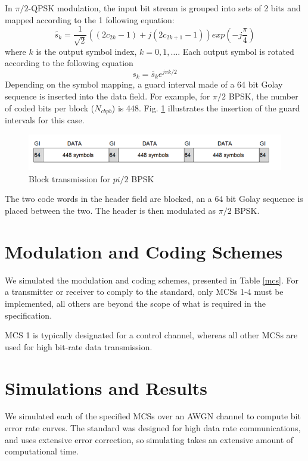 \documentclass[conference]{IEEEtran}
\begin{document}
In $\pi/2$-QPSK modulation, the input bit stream is grouped into sets of 2 bits and mapped according to the
1
following equation: 
\begin{equation}
\tilde{s_k} = \frac{1}{\sqrt{2}}((2c_{2k}-1)+j(2c_{2k+1}-1))exp(-j\frac{\pi}{4})
\end{equation}
where $k$ is the output symbol index, $k=0,1,\hdots$. Each output symbol is rotated according to the following equation
\begin{equation}
s_k = \tilde{s_k}e^{j\pi k/2}
\end{equation}
Depending on the symbol mapping, a guard interval made of a 64 bit Golay sequence is inserted into the data field. For example, for $\pi/2$ BPSK, the number of coded bits per block ($N_{cbpb}$) is 448. Fig. \ref{data} illustrates the insertion of the guard intervals for this case. 
\begin{figure}[htbp]
\centerline{\includegraphics[scale=.4]{./media/data.png}}
\caption{Block transmission for $pi/2$ BPSK}
\label{data}
\end{figure} 

The two code words in the header field are blocked, an a 64 bit Golay sequence is placed between the two. The header is then modulated as $\pi/2$ BPSK. 

\section{Modulation and Coding Schemes}
We simulated the modulation and coding schemes, presented in Table \ref{mcs}. For a transmitter or receiver to comply to the standard, only MCSs 1-4 must be implemented, all others are beyond the scope of what is required in the specification.


MCS 1 is typically designated for a control channel, whereas all other MCSs are used for high bit-rate data transmission. 



\section{Simulations and Results} 
We simulated each of the specified MCSs over an AWGN channel to compute bit error rate curves. The standard was designed for high data rate communications, and uses extensive error correction, so simulating takes an extensive amount of computational time. 
\end{document}
